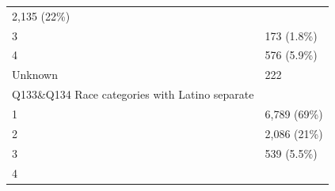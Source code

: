 \documentclass[]{article}
\begin{document}
\begin{longtable}[]{@{}ll@{}}
\begin{minipage}[t]{0.23\columnwidth}
2,135 (22\%)\strut
\end{minipage}\tabularnewline
\begin{minipage}[t]{0.71\columnwidth}\raggedright
3\strut
\end{minipage} & \begin{minipage}[t]{0.23\columnwidth}\raggedright
173 (1.8\%)\strut
\end{minipage}\tabularnewline
\begin{minipage}[t]{0.71\columnwidth}\raggedright
4\strut
\end{minipage} & \begin{minipage}[t]{0.23\columnwidth}\raggedright
576 (5.9\%)\strut
\end{minipage}\tabularnewline
\begin{minipage}[t]{0.71\columnwidth}\raggedright
Unknown\strut
\end{minipage} & \begin{minipage}[t]{0.23\columnwidth}\raggedright
222\strut
\end{minipage}\tabularnewline
\begin{minipage}[t]{0.71\columnwidth}\raggedright
Q133\&Q134 Race categories with Latino separate\strut
\end{minipage} & \begin{minipage}[t]{0.23\columnwidth}\raggedright
\strut
\end{minipage}\tabularnewline
\begin{minipage}[t]{0.71\columnwidth}\raggedright
1\strut
\end{minipage} & \begin{minipage}[t]{0.23\columnwidth}\raggedright
6,789 (69\%)\strut
\end{minipage}\tabularnewline
\begin{minipage}[t]{0.71\columnwidth}\raggedright
2\strut
\end{minipage} & \begin{minipage}[t]{0.23\columnwidth}\raggedright
2,086 (21\%)\strut
\end{minipage}\tabularnewline
\begin{minipage}[t]{0.71\columnwidth}\raggedright
3\strut
\end{minipage} & \begin{minipage}[t]{0.23\columnwidth}\raggedright
539 (5.5\%)\strut
\end{minipage}\tabularnewline
\begin{minipage}[t]{0.71\columnwidth}\raggedright
4\strut
\end{minipage} & \begin{minipage}[t]{0.23\columnwidth}\raggedright

\end{minipage}
\end{longtable}
\end{document}
